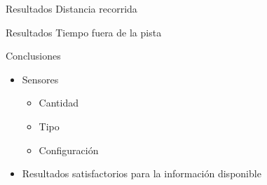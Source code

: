 \documentclass[spanish]{beamer}
\begin{document}
\begin{frame}{Resultados}
Distancia recorrida

\end{frame}

\begin{frame}{Resultados}
Tiempo fuera de la pista

\end{frame}

\begin{frame}{Conclusiones}
  \begin{itemize}
  \item Sensores
    \begin{itemize}
    \item Cantidad
    \item Tipo
    \item Configuración
    \end{itemize}
  \item Resultados satisfactorios para la información disponible
  \end{itemize}
\end{frame}
\end{document}
